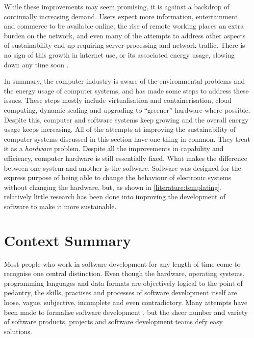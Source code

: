 While these improvements may seem promising, it is against a backdrop of continually increasing demand. Users expect more information, entertainment and commerce to be available online, the rise of remote working places an extra burden on the network, and even many of the attempts to address other aspects of sustainability end up requiring server processing and network traffic. There is no sign of this growth in internet use, or its associated energy usage, slowing down any time soon \citep{Morley2018} \citep{Odlyzko2016}.

\label{A23}
In summary, the computer industry is aware of the environmental problems and the energy usage of computer systems, and has made some steps to address these issues. These steps mostly include \gls{virtualisation} and \gls{containerisation}, \gls{cloud computing}, \gls{dynamic scaling} and \gls{upgrading} to \enquote{greener} hardware where possible. Despite this, computer and software systems keep growing and the overall energy usage keeps increasing. All of the attempts at improving the sustainability of computer systems discussed in this section have one thing in common. They treat it as a \emph{hardware} problem. Despite all the improvements in capability and efficiency, computer hardware is still essentially fixed. What makes the difference between one system and another is the software. Software was designed for the express purpose of being able to change the behaviour of electronic systems without changing the hardware, but, as shown in \autoref{literature:templating}, relatively little research has been done into improving the development of software to make it more sustainable.


\section{Context Summary}
\label{section:motivation summary}

Most people who work in software development for any length of time come to recognise one central distinction. Even though the hardware, operating systems, \gls{programming language}s and data formats are objectively logical to the point of pedantry, the skills, practises and processes of software development itself are loose, vague, subjective, incomplete and even contradictory. Many attempts have been made to formalise software development \citep{Glass2002}, but the sheer number and variety of software products, projects and software development teams defy easy solutions.


